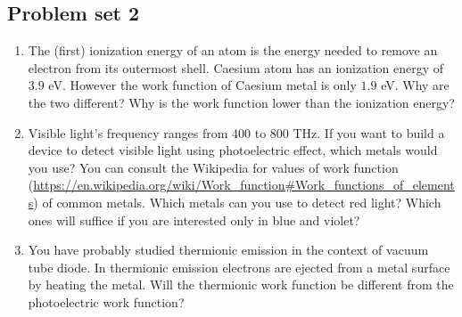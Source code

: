 \subsection{Problem set 2}
\begin{enumerate}
\item The (first) ionization energy of an atom is the energy needed to remove
an electron from its outermost shell. Caesium atom has an ionization energy of
$3.9$ eV. However the work function of Caesium metal is only $1.9$ eV. Why are
the two different? Why is the work function lower than the ionization energy?
\item Visible light's frequency ranges from $400$ to $800$ THz. If you want 
to build a device to detect visible light using photoelectric effect, which 
metals would you use? You can consult the Wikipedia for values of work function
(\url{https://en.wikipedia.org/wiki/Work_function#Work_functions_of_elements})
of common metals. Which metals can you use to detect red light? Which ones will
suffice if you are interested only in blue and violet?
\item You have probably studied thermionic emission in the context of vacuum
tube diode. In thermionic emission electrons are ejected from a metal surface
by heating the metal. Will the thermionic work function be different from the
photoelectric work function?
\end{enumerate}

